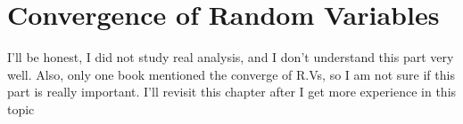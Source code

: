 \chapter{Convergence of Random Variables}
I'll be honest, I did not study real analysis, and I don't understand this part very well. Also, only one book mentioned the converge of R.Vs, so I am not sure if this part is really important.
I'll revisit this chapter after I get more experience in this topic